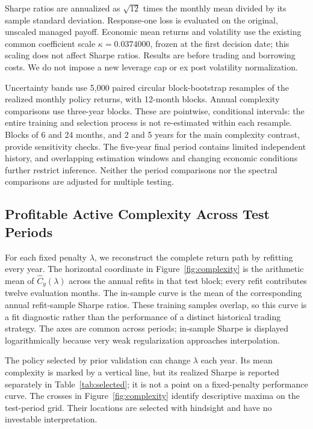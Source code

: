 \documentclass[12pt,letterpaper]{article}
\newcommand{\C}{\widehat C}
\begin{document}
Sharpe ratios are annualized as $\sqrt{12}$ times the monthly mean divided by its sample standard deviation. Response-one loss is evaluated on the original, unscaled managed payoff. Economic mean returns and volatility use the existing common coefficient scale $\kappa=0.0374000$, frozen at the first decision date; this scaling does not affect Sharpe ratios. Results are before trading and borrowing costs. We do not impose a new leverage cap or ex post volatility normalization.

Uncertainty bands use 5,000 paired circular block-bootstrap resamples of the realized monthly policy returns, with 12-month blocks. Annual complexity comparisons use three-year blocks. These are pointwise, conditional intervals: the entire training and selection process is not re-estimated within each resample. Blocks of 6 and 24 months, and 2 and 5 years for the main complexity contrast, provide sensitivity checks. The five-year final period contains limited independent history, and overlapping estimation windows and changing economic conditions further restrict inference. Neither the period comparisons nor the spectral comparisons are adjusted for multiple testing.

\subsection{Profitable Active Complexity Across Test Periods}

For each fixed penalty $\lambda$, we reconstruct the complete return path by refitting every year. The horizontal coordinate in Figure~\ref{fig:complexity} is the arithmetic mean of $\C_y(\lambda)$ across the annual refits in that test block; every refit contributes twelve evaluation months. The in-sample curve is the mean of the corresponding annual refit-sample Sharpe ratios. These training samples overlap, so this curve is a fit diagnostic rather than the performance of a distinct historical trading strategy. The axes are common across periods; in-sample Sharpe is displayed logarithmically because very weak regularization approaches interpolation.

The policy selected by prior validation can change $\lambda$ each year. Its mean complexity is marked by a vertical line, but its realized Sharpe is reported separately in Table~\ref{tab:selected}; it is not a point on a fixed-penalty performance curve. The crosses in Figure~\ref{fig:complexity} identify descriptive maxima on the test-period grid. Their locations are selected with hindsight and have no investable interpretation.
\end{document}
